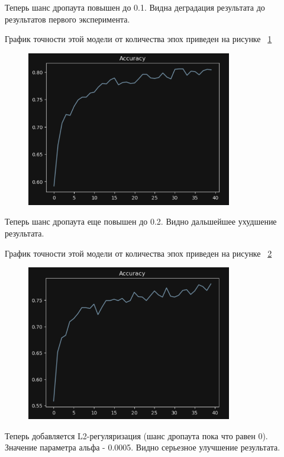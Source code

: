 \documentclass[a4paper, 14pt]{extarticle}
\begin{document}
Теперь шанс дропаута повышен до 0.1. Видна деградация результата до результатов первого эксперимента.

График точности этой модели от количества эпох приведен на рисунке ~\ref{fig:img3}

\begin{figure}[H]
\centering
\includegraphics[width=0.8\textwidth]{images/res3.png}
\caption{}
\label{fig:img3}
\end{figure}

Теперь шанс дропаута еще повышен до 0.2. Видно дальшейшее ухудшение результата.

График точности этой модели от количества эпох приведен на рисунке ~\ref{fig:img4}

\begin{figure}[H]
\centering
\includegraphics[width=0.8\textwidth]{images/res4.png}
\caption{}
\label{fig:img4}
\end{figure}

Теперь добавляется L2-регуляризация (шанс дропаута пока что равен 0). Значение параметра альфа - 0.0005. Видно серьезное улучшение результата.
\end{document}

